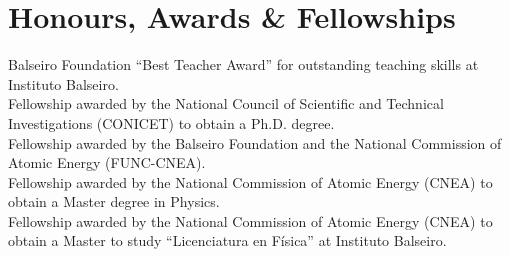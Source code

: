 \ifeng
\section*{Honours, Awards \& Fellowships}
\noindent
Balseiro Foundation ``Best Teacher Award'' for outstanding teaching
skills at Instituto Balseiro.\\
Fellowship awarded by the National Council of Scientific and
Technical Investigations (CONICET) to obtain a Ph.D. degree.\\
Fellowship awarded by the Balseiro Foundation and the National
Commission of Atomic Energy (FUNC-CNEA).\\
Fellowship awarded by the National Commission of Atomic Energy
(CNEA) to obtain a Master degree in Physics.\\
Fellowship awarded by the National Commission of Atomic
Energy (CNEA) to obtain a Master to study ``Licenciatura en Física'' at
Instituto Balseiro.
\else
